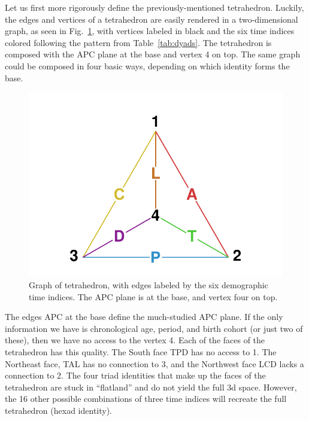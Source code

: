 \documentclass[12pt,oneside,a4paper]{article} %
\begin{document}
Let us first more rigorously define the previously-mentioned tetrahedron.
Luckily, the edges and vertices of a tetrahedron are easily rendered in a
two-dimensional graph, as seen in Fig.~\ref{fig:tet}, with vertices labeled
in black and the six time indices colored following the pattern from
Table~\ref{tab:dyads}. The tetrahedron is composed with the APC plane at the
base and vertex 4 on top. The same graph could be composed in four basic
ways, depending on which identity forms the base.

\begin{figure}[h!]
\centering
\caption{Graph of tetrahedron, with edges labeled by the six demographic time
indices. The APC plane is at the base, and vertex four on top.}
\label{fig:tet}
\includegraphics[scale=.8]{Figures/TetraHedronVerticesEdges.pdf}
\end{figure}

The edges APC at the base define the much-studied APC plane. If the only
information we have is chronological age, period, and birth cohort (or just two
of these), then we have no access to the vertex 4. Each of the faces of the
tetrahedron has this quality. The South face TPD has no access to 1.
The Northeast face, TAL has no connection to 3, and the Northwest face
LCD lacks a connection to 2. The four triad identities that make up the faces of
the tetrahedron are stuck in ``flatland'' and do not yield the full 3d
space. However, the 16 other possible combinations of three time indices will
recreate the full tetrahedron (hexad identity).
\end{document}

